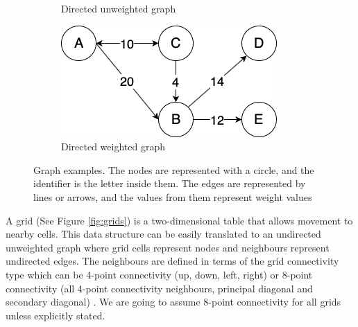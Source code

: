 \begin{figure}[h!]
\begin{subfigure}[b]{0.18\linewidth}
    \caption{Directed unweighted graph}
  \end{subfigure}
  \hfill
  \begin{subfigure}[b]{0.18\linewidth}
    \includegraphics[width=\linewidth]{images/directed_weighted_graph.png}
    \caption{Directed weighted graph}
  \end{subfigure}
  \caption{Graph examples. The nodes are represented with a circle, and the identifier is the letter inside them. The edges are represented by lines or arrows, and the values from them represent weight values}
  \label{fig:graphs}
\end{figure}

A grid (See Figure \ref{fig:grids}) is a two-dimensional table that allows movement to nearby cells. This data structure can be easily translated to an undirected unweighted graph where grid cells represent nodes and neighbours represent undirected edges. The neighbours are defined in terms of the grid connectivity type which can be 4-point connectivity (up, down, left, right) or 8-point connectivity (all 4-point connectivity neighbours, principal diagonal and secondary diagonal) \cite{choset2005principles}. We are going to assume 8-point connectivity for all grids unless explicitly stated.

